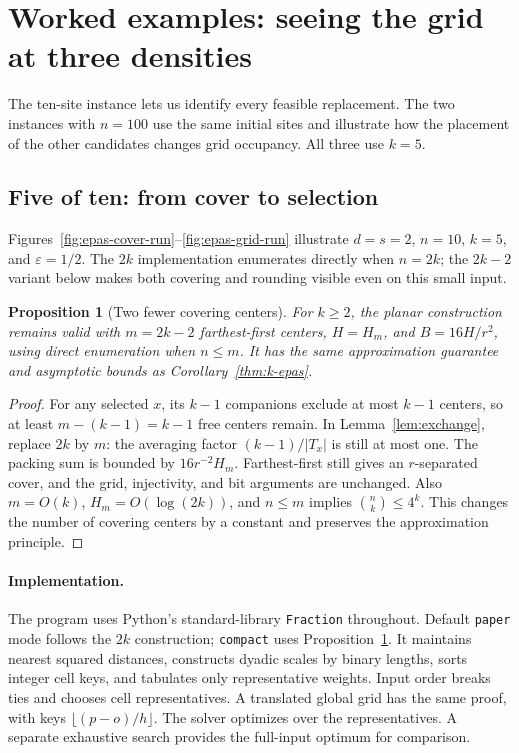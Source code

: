 \documentclass[a4paper,12pt]{article}
\newtheorem{proposition}[theorem]{Proposition}
\numberwithin{equation}{section}
\begin{document}
\section{Worked examples: seeing the grid at three densities}\label{app:walk}
The ten-site instance lets us identify every feasible replacement. The two instances with
$n=100$ use the same initial sites and illustrate how the placement of the other candidates
changes grid occupancy. All three use $k=5$.

\subsection{Five of ten: from cover to selection}\label{sec:epas-gallery}
Figures~\ref{fig:epas-cover-run}--\ref{fig:epas-grid-run} illustrate $d=s=2$, $n=10$, $k=5$, and
$\varepsilon=1/2$. The $2k$ implementation enumerates directly when $n=2k$; the $2k-2$ variant
below makes both covering and rounding visible even on this small input.

\begin{proposition}[Two fewer covering centers]\label{prop:epas-compact-cover}
For $k\ge2$, the planar construction remains valid with $m=2k-2$ farthest-first centers, $H=H_m$,
and $B=16H/r^2$, using direct enumeration when $n\le m$. It has the same approximation guarantee
and asymptotic bounds as Corollary~\ref{thm:k-epas}.
\end{proposition}
\begin{proof}
For any selected $x$, its $k-1$ companions exclude at most $k-1$ centers, so at least
$m-(k-1)=k-1$ free centers remain. In Lemma~\ref{lem:exchange}, replace $2k$ by $m$: the averaging
factor $(k-1)/|T_x|$ is still at most one. The packing sum is bounded by $16r^{-2}H_m$.
Farthest-first still gives an $r$-separated cover, and the grid, injectivity, and bit arguments
are unchanged. Also $m=O(k)$, $H_m=O(\log(2k))$, and $n\le m$ implies $\binom nk\le4^k$. This
changes the number of covering centers by a constant and preserves the approximation principle.
\end{proof}

\paragraph{Implementation.}
The program  uses Python's standard-library \texttt{Fraction}
throughout. Default \texttt{paper} mode follows the $2k$ construction; \texttt{compact} uses
Proposition~\ref{prop:epas-compact-cover}. It maintains nearest squared distances, constructs
dyadic scales by binary lengths, sorts integer cell keys, and tabulates only representative
weights. Input order breaks ties and chooses cell representatives. A translated global grid has
the same proof, with keys $\lfloor(p-o)/h\rfloor$. The solver optimizes over the representatives. A separate exhaustive search provides
the full-input optimum for comparison.
\end{document}
